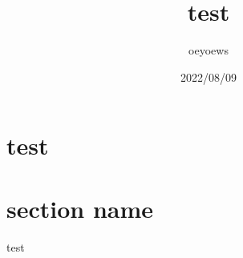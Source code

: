 \documentclass{article}
\title{test}
\author{oeyoews}
\date{2022/08/09}
\begin{document}
\maketitle


% 
\section{test}%
\label{sec:test}

\section{section name}%
\label{sec:section name}
test
\end{document}
